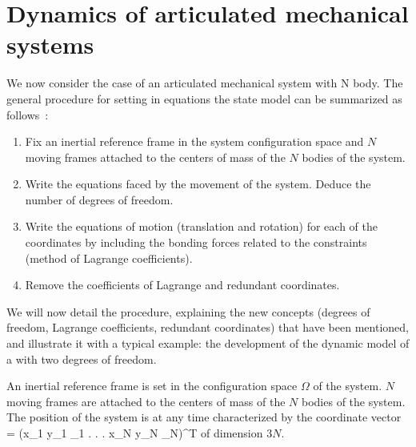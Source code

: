\section{Dynamics of articulated mechanical systems}

We now consider the case of an articulated mechanical system with N body. The general procedure for setting in equations the state model can be summarized as follows~:
\begin{enumerate}
\item Fix an inertial reference frame in the system configuration space and $N$ moving frames attached to the centers of mass of the $N$ bodies of the system.
\item Write the  equations faced by the movement of the system. Deduce the number of degrees of freedom.
\item Write the equations of motion (translation and rotation) for each of the coordinates by including the bonding forces related to the constraints (method of Lagrange coefficients).
\item Remove the coefficients of Lagrange and redundant coordinates.
\end{enumerate}

We will now detail the procedure, explaining the new concepts (degrees of freedom, Lagrange coefficients, redundant coordinates) that have been mentioned, and illustrate it with a typical example: the development of the dynamic model of a  with two degrees of freedom.

\vspace{5mm}


An inertial reference frame is set in the configuration space $\Omega$ of the system. $N$ moving frames are attached to the centers of mass of the $N$ bodies of the system. The position of the system is at any time characterized by the coordinate vector
\eqnn
\xi = (x_1 \; y_1 \; \theta_1 \; . \; . \; .\; x_N\; y_N\; \theta_N)^{T}
\eeqnn
of dimension $3N$.

\vspace{5mm}


